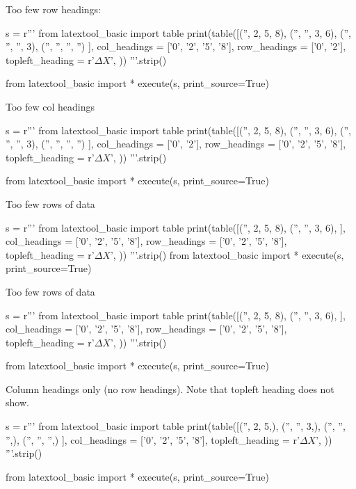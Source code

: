 \newpage
Too few row headings:
\begin{python}
s = r'''
from latextool_basic import table
print(table([('',  2, 5,  8),
             ('', '', 3,  6),
             ('', '', '', 3),
             ('', '', '', '')
            ],
            col_headings = ['0', '2', '5', '8'],
            row_headings = ['0', '2'],
            topleft_heading = r'$\Delta X$',
           ))
'''.strip()

from latextool_basic import *
execute(s, print_source=True)
\end{python}


\newpage
Too few col headings
\begin{python}
s = r'''
from latextool_basic import table
print(table([('',  2, 5,  8),
             ('', '', 3,  6),
             ('', '', '', 3),
             ('', '', '', '')
            ],
            col_headings = ['0', '2'],
            row_headings = ['0', '2', '5', '8'],
            topleft_heading = r'$\Delta X$',
           ))
'''.strip()

from latextool_basic import *
execute(s, print_source=True)
\end{python}


\newpage
Too few rows of data
\begin{python}
s = r'''
from latextool_basic import table
print(table([('',  2, 5,  8),
             ('', '', 3,  6),
            ],
            col_headings = ['0', '2', '5', '8'],
            row_headings = ['0', '2', '5', '8'],
            topleft_heading = r'$\Delta X$',
           ))
'''.strip()
from latextool_basic import *
execute(s, print_source=True)
\end{python}


\newpage
Too few rows of data
\begin{python}
s = r'''
from latextool_basic import table
print(table([('',  2, 5,  8),
             ('', '', 3,  6),
            ],
            col_headings = ['0', '2', '5', '8'],
            row_headings = ['0', '2', '5', '8'],
            topleft_heading = r'$\Delta X$',
           ))
'''.strip()

from latextool_basic import *
execute(s, print_source=True)
\end{python}


\newpage
Column headings only (no row headings).
Note that topleft heading does not show.

\begin{python}
s = r'''
from latextool_basic import table
print(table([('',  2, 5,),
             ('', '', 3,),
             ('', '', '',),
             ('', '', '',)
            ],
            col_headings = ['0', '2', '5', '8'],
            topleft_heading = r'$\Delta X$',
           ))
'''.strip()

from latextool_basic import *
execute(s, print_source=True)
\end{python}


